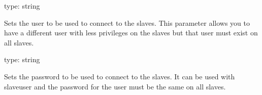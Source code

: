 \documentclass[letterpaper,10pt,english]{sphinxmanual}
\begin{document}
\begin{fulllineitems}
\label{\detokenize{mariadb-query-digest:cmdoption-mariadb-query-digest-slave-user}}
type: string

Sets the user to be used to connect to the slaves.
This parameter allows you to have a different user with less privileges on the
slaves but that user must exist on all slaves.

\end{fulllineitems}


\begin{fulllineitems}
\label{\detokenize{mariadb-query-digest:cmdoption-mariadb-query-digest-slave-password}}
type: string

Sets the password to be used to connect to the slaves.
It can be used with \textendash{}slave\sphinxhyphen{}user and the password for the user must be the same
on all slaves.

\end{fulllineitems}

\end{document}
